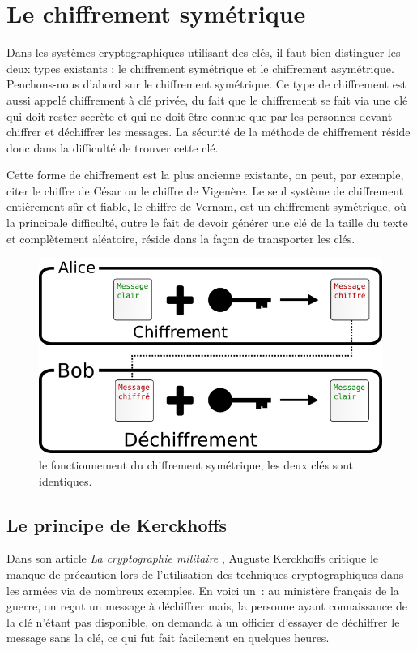 \section{Le chiffrement symétrique}
Dans les systèmes cryptographiques utilisant des clés, il faut bien
distinguer les deux types existants : le chiffrement symétrique et le
chiffrement asymétrique. Penchons-nous d'abord sur le chiffrement
symétrique. Ce type de chiffrement est aussi appelé chiffrement à clé
privée, du fait que le chiffrement se fait via une clé qui doit rester
secrète et qui ne doit être connue que par les personnes devant
chiffrer et déchiffrer les messages. La sécurité de la méthode de
chiffrement réside donc dans la difficulté de trouver cette
clé. 

Cette forme de chiffrement est la plus ancienne existante, on
peut, par
exemple, citer le chiffre de César ou le chiffre de Vigenère. Le seul
système de chiffrement entièrement sûr et fiable, le chiffre de
Vernam,
est un chiffrement symétrique, où la principale difficulté, outre le
fait de devoir générer une clé de la taille du texte et complètement
aléatoire, réside dans la façon de transporter les clés.

\begin{figure}[h]
  \begin{center}
    \includegraphics[scale=0.5]{images/ChiffrementSymetrique.png}
  \end{center}
  \caption{le fonctionnement du chiffrement symétrique, les deux clés
    sont identiques.}
  \label{fig:ChiffrementSymetrique}
\end{figure}

\subsection{Le principe de Kerckhoffs\label{sec:PrincipeKerckhoffs}}
Dans son article \emph{La cryptographie militaire}
\cite{CryptographieMilitaire1,CryptographieMilitaire2}, Auguste
Kerckhoffs critique le manque de précaution lors de l'utilisation des
techniques cryptographiques dans les armées via de nombreux exemples.
En voici un~: au ministère français de la guerre, on
reçut
un message à déchiffrer mais, la personne ayant connaissance de la clé
n'étant pas disponible, on demanda à un officier d'essayer de
déchiffrer le message sans la clé, ce qui fut fait facilement en
quelques heures.

